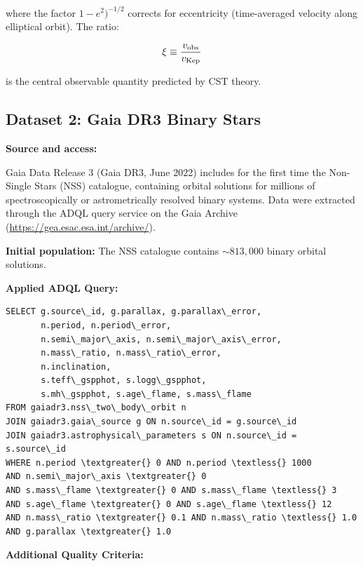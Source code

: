 \documentclass[11pt,a4paper]{article}
\begin{document}
where the factor \(1-e^2)^{-1/2}\) corrects for eccentricity
(time-averaged velocity along elliptical orbit). The ratio:

\[\xi \equiv \frac{v_{\rm obs}}{v_{\rm Kep}}\]

is the central observable quantity predicted by CST theory.

\hypertarget{dataset-2-gaia-dr3-binary-stars}{%
\subsection{Dataset 2: Gaia DR3 Binary
Stars}\label{dataset-2-gaia-dr3-binary-stars}}

\textbf{Source and access:}

Gaia Data Release 3 \cite{GaiaCollaboration2023a} (Gaia DR3, June 2022) includes for the first time
the Non-Single Stars (NSS) catalogue, containing orbital solutions for
millions of spectroscopically or astrometrically resolved binary
systems. Data were extracted through the ADQL query service on the Gaia
Archive (\url{https://gea.esac.esa.int/archive/}).

\textbf{Initial population:} The NSS catalogue contains \(\sim 813,000\)
binary orbital solutions.

\textbf{Applied ADQL Query:}

\begin{lstlisting}
SELECT g.source\_id, g.parallax, g.parallax\_error,
       n.period, n.period\_error,
       n.semi\_major\_axis, n.semi\_major\_axis\_error,
       n.mass\_ratio, n.mass\_ratio\_error,
       n.inclination,
       s.teff\_gspphot, s.logg\_gspphot,
       s.mh\_gspphot, s.age\_flame, s.mass\_flame
FROM gaiadr3.nss\_two\_body\_orbit n
JOIN gaiadr3.gaia\_source g ON n.source\_id = g.source\_id  
JOIN gaiadr3.astrophysical\_parameters s ON n.source\_id = s.source\_id
WHERE n.period \textgreater{} 0 AND n.period \textless{} 1000
AND n.semi\_major\_axis \textgreater{} 0
AND s.mass\_flame \textgreater{} 0 AND s.mass\_flame \textless{} 3
AND s.age\_flame \textgreater{} 0 AND s.age\_flame \textless{} 12
AND n.mass\_ratio \textgreater{} 0.1 AND n.mass\_ratio \textless{} 1.0
AND g.parallax \textgreater{} 1.0
\end{lstlisting}

\textbf{Additional Quality Criteria:}
\end{document}
